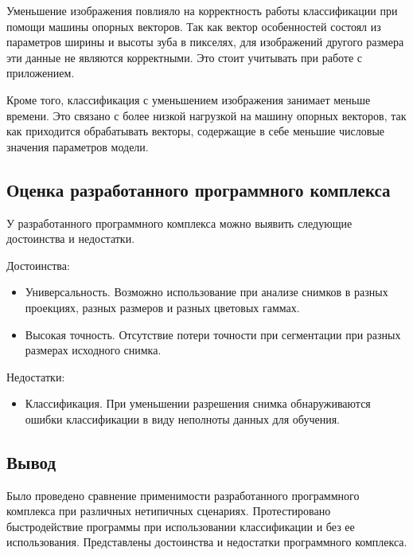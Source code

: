 Уменьшение изображения повлияло на корректность работы классификации при помощи машины опорных векторов. Так как вектор особенностей состоял из параметров ширины и высоты зуба в пикселях, для изображений другого размера эти данные не являются корректными. Это стоит учитывать при работе с приложением.

Кроме того, классификация с уменьшением изображения занимает меньше времени. Это связано с более низкой нагрузкой на машину опорных векторов, так как приходится обрабатывать векторы, содержащие в себе меньшие числовые значения параметров модели.

\subsection{Оценка разработанного программного комплекса}

У разработанного программного комплекса можно выявить следующие достоинства и недостатки.

Достоинства:
\begin{itemize}
	\item Универсальность. Возможно использование при анализе снимков в разных проекциях, разных размеров и разных цветовых гаммах.
	\item Высокая точность. Отсутствие потери точности при сегментации при разных размерах исходного снимка.
\end{itemize}

Недостатки:
\begin{itemize}
	\item Классификация. При уменьшении разрешения снимка обнаруживаются ошибки классификации в виду неполноты данных для обучения.
\end{itemize}

\subsection*{Вывод}

Было проведено сравнение применимости разработанного программного комплекса при различных нетипичных сценариях. Протестировано быстродействие программы при использовании классификации и без ее использования. Представлены достоинства и недостатки программного комплекса.